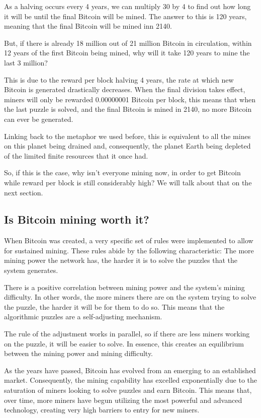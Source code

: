 \documentclass{article}
\newcommand\tab[1][1cm]{\hspace*{#1}}
\begin{document}
As a halving occurs every 4 years, we can multiply 30 by 4 to find out how long it will be until the final Bitcoin will be mined. The answer to this is 120 years, meaning that the final Bitcoin will be mined inn 2140.

But, if there is already 18 million out of 21 million Bitcoin in circulation, within 12 years of the first Bitcoin being mined, why will it take 120 years to mine the last 3 million?

This is due to the reward per block halving 4 years, the rate at which new Bitcoin is generated drastically decreases. When the final division takes effect, miners will only be rewarded 0.00000001 Bitcoin per block, this means that when the last puzzle is solved, and the final Bitcoin is mined in 2140, no more Bitcoin can ever be generated.

Linking back to the metaphor we used before, this is equivalent to all the mines on this planet being drained and, consequently, the planet Earth being depleted of the limited finite resources that it once had.

So, if this is the case, why isn't everyone mining now, in order to get Bitcoin while reward per block is still considerably high? We will talk about that on the next section.

\subsection{Is Bitcoin mining worth it?}

\tab When Bitcoin was created, a very specific set of rules were implemented to allow for sustained mining. These rules abide by the following characteristic: The more mining power the network has, the harder it is to solve the puzzles that the system generates.

There is a positive correlation between mining power and the system's mining difficulty. In other words, the more miners there are on the system trying to solve the puzzle, the harder it will be for them to do so. This means that the algorithmic puzzles are a self-adjusting mechanism.

The rule of the adjustment works in parallel, so if there are less miners working on the puzzle, it will be easier to solve. In essence, this creates an equilibrium between the mining power and mining difficulty.

As the years have passed, Bitcoin has evolved from an emerging to an established market. Consequently, the mining capability has excelled exponentially due to the saturation of miners looking to solve puzzles and earn Bitcoin. This means that, over time, more miners have begun utilizing the most powerful and advanced technology, creating very high barriers to entry for new miners.
\end{document}
